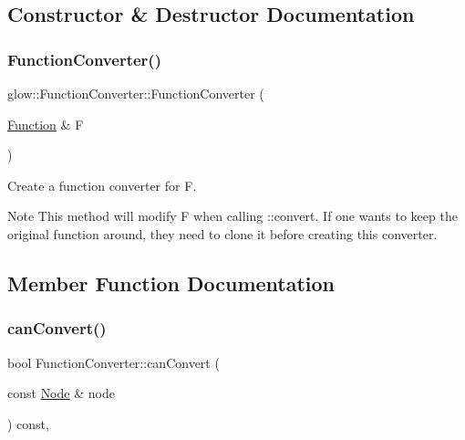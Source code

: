 \subsection{Constructor \& Destructor Documentation}
\mbox{\label{classglow_1_1_function_converter_a38d2ef15178da614c3ffb48cdeeade76}} 
\subsubsection{\texorpdfstring{Function\+Converter()}{FunctionConverter()}}
{\footnotesize\ttfamily glow\+::\+Function\+Converter\+::\+Function\+Converter (\begin{DoxyParamCaption}\item[{\hyperlink{classglow_1_1_function}{Function} \&}]{F }\end{DoxyParamCaption})\hspace{0.3cm}{\ttfamily [inline]}}

Create a function converter for {\ttfamily F}.

\begin{DoxyNote}{Note}
This method will modify {\ttfamily F} when calling \+::convert. If one wants to keep the original function around, they need to clone it before creating this converter. 
\end{DoxyNote}


\subsection{Member Function Documentation}
\mbox{\label{classglow_1_1_function_converter_a6f49461b0e1845488f1dfac4531ec898}} 
\subsubsection{\texorpdfstring{can\+Convert()}{canConvert()}}
{\footnotesize\ttfamily bool Function\+Converter\+::can\+Convert (\begin{DoxyParamCaption}\item[{const \hyperlink{classglow_1_1_node}{Node} \&}]{node }\end{DoxyParamCaption}) const\hspace{0.3cm}{\ttfamily [protected]}, {\ttfamily [virtual]}}

